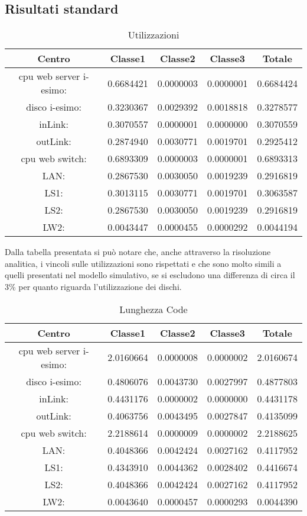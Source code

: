 \subsection{Risultati standard}
\begin{table}[H]
\begin{center}
\begin{tabular}{||c|c|c|c|c||}
\hline
Centro &Classe1 &Classe2 &Classe3 &Totale\\
\hline
\hline
 cpu web server i-esimo: 	&0.6684421	&0.0000003	&0.0000001	&0.6684424	\\\hline
 disco i-esimo: 	&0.3230367	&0.0029392	&0.0018818	&0.3278577	\\\hline
 inLink: 	&0.3070557	&0.0000001	&0.0000000	&0.3070559	\\\hline
 outLink: 	&0.2874940	&0.0030771	&0.0019701	&0.2925412	\\\hline
 cpu web switch: 	&0.6893309	&0.0000003	&0.0000001	&0.6893313	\\\hline
 LAN: 	&0.2867530	&0.0030050	&0.0019239	&0.2916819	\\\hline
 LS1: 	&0.3013115	&0.0030771	&0.0019701	&0.3063587	\\\hline
 LS2:	&0.2867530	&0.0030050	&0.0019239	&0.2916819	\\\hline
 LW2: 	&0.0043447	&0.0000455	&0.0000292	&0.0044194	\\\hline
\end{tabular}
\end{center}
\caption{Utilizzazioni}
\label{utilizzazioni}
\end{table}
Dalla tabella presentata si può notare che, anche attraverso la risoluzione analitica, i vincoli sulle utilizzazioni sono rispettati e che sono molto simili a quelli presentati nel modello simulativo, se si escludono una differenza di circa il 3\% per quanto riguarda l'utilizzazione dei dischi.
\begin{table}[H]
\begin{center}
\begin{tabular}{||c|c|c|c|c||}
\hline
Centro &Classe1 &Classe2 &Classe3 &Totale\\
\hline
\hline
 cpu web server i-esimo: 	&2.0160664	&0.0000008	&0.0000002	&2.0160674	\\\hline
 disco i-esimo: 	&0.4806076	&0.0043730	&0.0027997	&0.4877803	\\\hline
 inLink: 	&0.4431176	&0.0000002	&0.0000000	&0.4431178	\\\hline
 outLink: 	&0.4063756	&0.0043495	&0.0027847	&0.4135099	\\\hline
 cpu web switch: 	&2.2188614	&0.0000009	&0.0000002	&2.2188625	\\\hline
 LAN: 	&0.4048366	&0.0042424	&0.0027162	&0.4117952	\\\hline
 LS1: 	&0.4343910	&0.0044362	&0.0028402	&0.4416674	\\\hline
 LS2: 	&0.4048366	&0.0042424	&0.0027162	&0.4117952	\\\hline
 LW2: 	&0.0043640	&0.0000457	&0.0000293	&0.0044390	\\\hline
\end{tabular}
\end{center}
\caption{Lunghezza Code}
\label{lunghezzacode}
\end{table}
